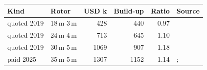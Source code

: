 \begin{tabular}{@{}llrrr>{\raggedright\arraybackslash}p{4.2cm}@{}}
\toprule
Kind & Rotor & USD k & Build-up & Ratio & Source \\
\midrule
quoted 2019 & 18\,m \texttimes{} 3\,m & \num{428} & \num{440} & 0.97 & \citealp[p. 15]{tillig2020b} \\
quoted 2019 & 24\,m \texttimes{} 4\,m & \num{713} & \num{645} & 1.10 & \citealp[p. 15]{tillig2020b} \\
quoted 2019 & 30\,m \texttimes{} 5\,m & \num{1069} & \num{907} & 1.18 & \citealp[p. 15]{tillig2020b} \\
paid 2025 & 35\,m \texttimes{} 5\,m & \num{1307} & \num{1152} & 1.14 & \citealp{maritimeexec2026anemoi}; \citealp{govuk2026chinavisit} \\
\bottomrule
\end{tabular}

